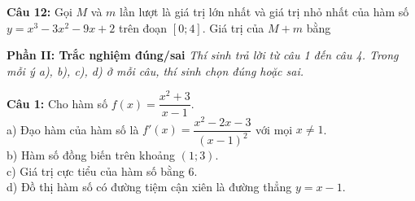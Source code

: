 \documentclass[12pt,a4paper]{article}
\begin{document}
\noindent \textbf{Câu 12:} Gọi $M$ và $m$ lần lượt là giá trị lớn nhất và giá trị nhỏ nhất của hàm số $y=x^3-3x^2-9x+2$ trên đoạn $[0;4]$. Giá trị của $M+m$ bằng\\
\noindent{}

\vspace{0.5cm}
\textbf{Phần II: Trắc nghiệm đúng/sai} \textit{Thí sinh trả lời từ câu 1 đến câu 4. Trong mỗi ý a), b), c), d) ở mỗi câu, thí sinh chọn đúng hoặc sai.}

\noindent \textbf{Câu 1:} Cho hàm số $f(x)=\dfrac{x^2+3}{x-1}$.\\
\noindent a) Đạo hàm của hàm số là $f'(x)=\dfrac{x^2-2x-3}{(x-1)^2}$ với mọi $x\neq 1$.\\

\noindent b) Hàm số đồng biến trên khoảng $(1;3)$.\\

\noindent c) Giá trị cực tiểu của hàm số bằng $6$.\\

\noindent d) Đồ thị hàm số có đường tiệm cận xiên là đường thẳng $y=x-1$.\\
\end{document}
